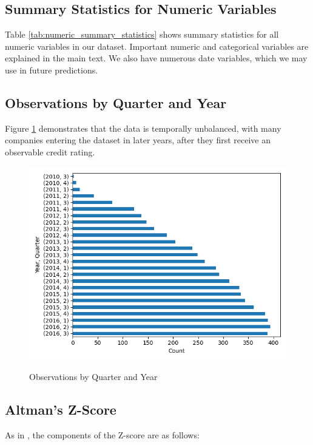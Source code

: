 \documentclass{article}[11pt]
\begin{document}
    \subsection{Summary Statistics for Numeric Variables}

    Table \ref{tab:numeric_summary_statistics} shows summary statistics for all numeric variables in our dataset. Important numeric and categorical variables are explained in the main text. We also have numerous date variables, which we may use in future predictions.

    

    \subsection{Observations by Quarter and Year}

    Figure \ref{fig:obs-by-quarter-year} demonstrates that the data is temporally unbalanced, with many companies entering the dataset in later years, after they first receive an observable credit rating.

    \begin{figure}[h!]
		\centering
        \caption{Observations by Quarter and Year}
        \includegraphics[width=0.6\linewidth,keepaspectratio=true]{../Output/All Data EDA/Tabular EDA/all_data_fixed_quarter_dates_obs_by_year_quarter_no_title.png}
        \label{fig:obs-by-quarter-year}
	\end{figure}

    \subsection{Altman's Z-Score}

    \label{sec:altman-z-score}

    As in \cite{das_credit_2023}, the components of the Z-score are as follows:
\end{document}
